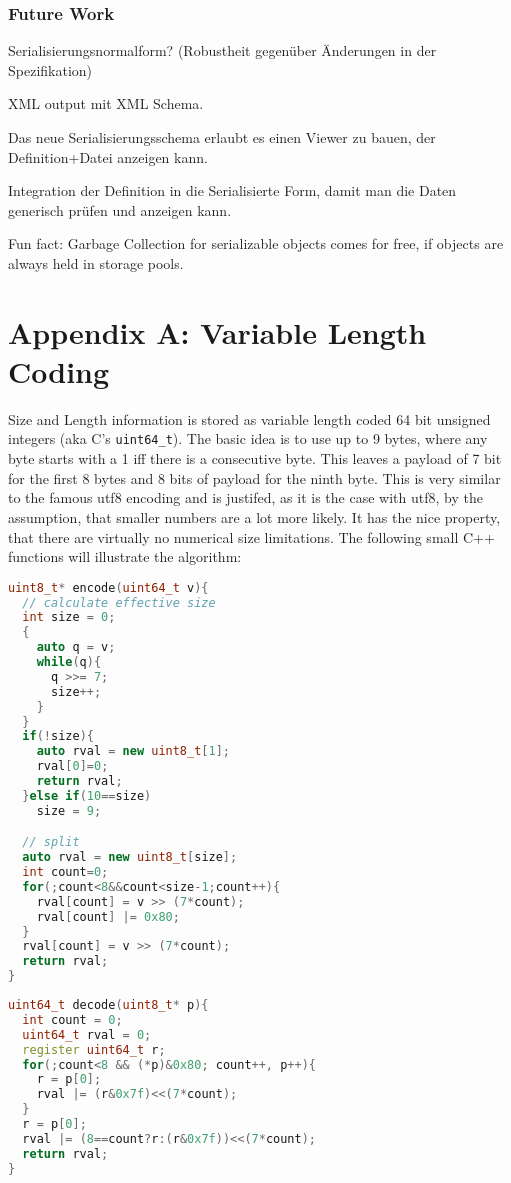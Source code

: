 \documentclass[a4paper,10pt]{article}
\begin{document}

\section{Future Work}

Serialisierungsnormalform? (Robustheit gegenüber Änderungen in der Spezifikation)

XML output mit XML Schema.

Das neue Serialisierungsschema erlaubt es einen Viewer zu bauen, der Definition+Datei anzeigen kann.

Integration der Definition in die Serialisierte Form, damit man die Daten generisch prüfen und anzeigen kann.

Fun fact: Garbage Collection for serializable objects comes for free, if objects are always held in storage pools.

\newpage
\todos

\part{Appendix A: Variable Length Coding}

Size and Length information is stored as variable length coded 64 bit unsigned integers (aka C's \texttt{uint64\_t}). The basic idea is to use up to 9 bytes, where any byte starts with a 1 iff there is a consecutive byte. This leaves a payload of 7 bit for the first 8 bytes and 8 bits of payload for the ninth byte. This is very similar to the famous utf8 encoding and is justifed, as it is the case with utf8, by the assumption, that smaller numbers are a lot more likely. It has the nice property, that there are virtually no numerical size limitations.
The following small C++ functions will illustrate the algorithm:
\begin{lstlisting}[label=v64enc,caption=Variable Length Encoding,language=C++]
uint8_t* encode(uint64_t v){
  // calculate effective size
  int size = 0;
  {
    auto q = v;
    while(q){
      q >>= 7;
      size++;
    }
  }
  if(!size){
    auto rval = new uint8_t[1];
    rval[0]=0;
    return rval;
  }else if(10==size)
    size = 9;

  // split
  auto rval = new uint8_t[size];
  int count=0;
  for(;count<8&&count<size-1;count++){
    rval[count] = v >> (7*count);
    rval[count] |= 0x80;
  }
  rval[count] = v >> (7*count);
  return rval;
}
\end{lstlisting}
\begin{lstlisting}[label=v64dec,caption=Variable Length Decoding,language=C++]
uint64_t decode(uint8_t* p){
  int count = 0;
  uint64_t rval = 0;
  register uint64_t r;
  for(;count<8 && (*p)&0x80; count++, p++){
    r = p[0];
    rval |= (r&0x7f)<<(7*count);
  }
  r = p[0];
  rval |= (8==count?r:(r&0x7f))<<(7*count);
  return rval;
}
\end{lstlisting}
\end{document}
